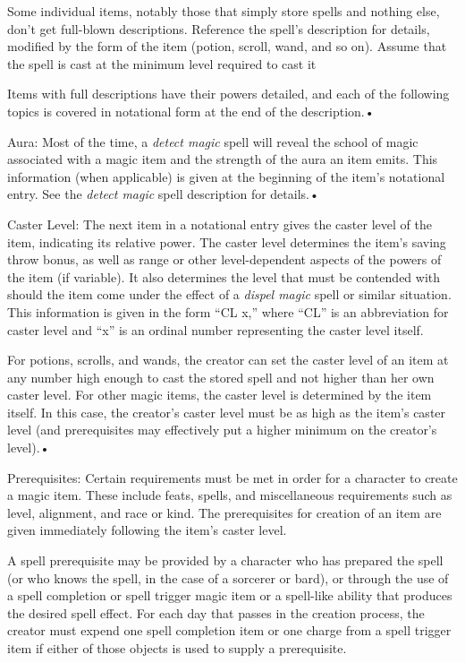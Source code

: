Some individual items, notably those that simply store spells and nothing else, 
don't get full-blown descriptions. Reference the spell's description for details, 
modified by the form of the item (potion, scroll, wand, and so on). Assume that 
the spell is cast at the minimum level required to cast it

Items with full descriptions have their powers detailed, and each of the following 
topics is covered in notational form at the end of the description.•

Aura: Most of the time, a \textit{detect magic }spell will reveal the school of 
magic associated with a magic item and the strength of the aura an item emits. 
This information (when applicable) is given at the beginning of the item's notational 
entry. See the \textit{detect magic }spell description\textit{ }for details.•

Caster Level: The next item in a notational entry gives the caster level of the 
item, indicating its relative power. The caster level determines the item's saving 
throw bonus, as well as range or other level-dependent aspects of the powers of 
the item (if variable). It also determines the level that must be contended with 
should the item come under the effect of a \textit{dispel magic }spell or similar 
situation. This information is given in the form ``CL x,'' where ``CL'' is an abbreviation 
for caster level and ``x'' is an ordinal number representing the caster level itself.

For potions, scrolls, and wands, the creator can set the caster level of an item 
at any number high enough to cast the stored spell and not higher than her own 
caster level. For other magic items, the caster level is determined by the item 
itself. In this case, the creator's caster level must be as high as the item's 
caster level (and prerequisites may effectively put a higher minimum on the creator's 
level).•

Prerequisites: Certain requirements must be met in order for a character to create 
a magic item. These include feats, spells, and miscellaneous requirements such 
as level, alignment, and race or kind. The prerequisites for creation of an item 
are given immediately following the item's caster level.

A spell prerequisite may be provided by a character who has prepared the spell 
(or who knows the spell, in the case of a sorcerer or bard), or through the use 
of a spell completion or spell trigger magic item or a spell-like ability that 
produces the desired spell effect. For each day that passes in the creation process, 
the creator must expend one spell completion item or one charge from a spell trigger 
item if either of those objects is used to supply a prerequisite.

